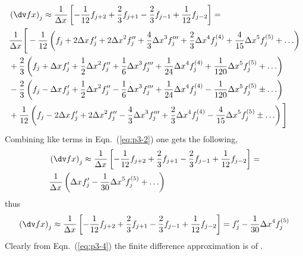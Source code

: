 \begin{equation}
    \begin{split}
        & \findif = \\ 
        & \frac{1}{\Dx{}} \Bigg[-\frac{1}{12}\left( \fj + 2\Dx{} \fj^{\prime} + 2\Dx{2} \fj^{\prime \prime} + \frac{4}{3} \Dx{3} \fj^{\prime \prime \prime} + \frac{2}{3} \Dx{4} \fderv{\fj}{4} + \frac{4}{15} \Dx{5} \fderv{\fj}{5} + \HOTs \right)\\
        & + \frac{2}{3}     \left(  \fj + \Dx{} \fj^{\prime} + \frac{1}{2}\Dx{2} \fj^{\prime \prime} + \frac{1}{6} \Dx{3} \fj^{\prime \prime \prime} + \frac{1}{24} \Dx{4} \fderv{\fj}{4} + \frac{1}{120} \Dx{5} \fderv{\fj}{5} + \HOTs \right)\\ 
        & - \frac{2}{3}     \left(  \fj - \Dx{} \fj^{\prime} + \frac{1}{2}\Dx{2} \fj^{\prime \prime} - \frac{1}{6} \Dx{3} \fj^{\prime \prime \prime} + \frac{1}{24} \Dx{4} \fderv{\fj}{4} - \frac{1}{120} \Dx{5} \fderv{\fj}{5} \pm \HOTs \right)\\
        & + \frac{1}{12}    \left(  \fj - 2\Dx{} \fj^{\prime} + 2\Dx{2} \fj^{\prime \prime} - \frac{4}{3} \Dx{3} \fj^{\prime \prime \prime} + \frac{2}{3} \Dx{4} \fderv{\fj}{4} - \frac{4}{15} \Dx{5} \fderv{\fj}{5} \pm \HOTs\right)\Bigg]  
    \end{split}
    \label{eq:p3-2}
\end{equation}
Combining like terms in Eqn.~(\ref{eq:p3-2}) one gets the following,
\begin{equation}
    \begin{split}
        & \findif =  \\
        & \frac{1}{\Dx{}} \left(\Dx{} \fj^{\prime} - \frac{1}{30} \Dx{5} \fderv{\fj}{5} + \HOTs \right)
    \end{split}
    \label{eq:p3-3}
\end{equation}
thus
\begin{equation}
    \findif = \fj^{\prime} - \frac{1}{30} \Dx{4} \fderv{\fj}{5}
    \label{eq:p3-4}
\end{equation}
Clearly from Eqn.~(\ref{eq:p3-4}) the finite difference approximation is of .

        
        

